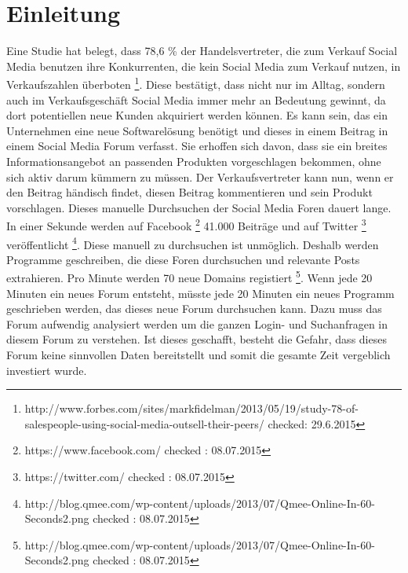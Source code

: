 
\section{Einleitung}
Eine Studie hat belegt, dass 78,6 \% der Handelsvertreter, die zum Verkauf Social Media benutzen ihre Konkurrenten, die kein Social Media zum Verkauf nutzen, in Verkaufszahlen überboten \footnote{http://www.forbes.com/sites/markfidelman/2013/05/19/study-78-of-salespeople-using-social-media-outsell-their-peers/ checked: 29.6.2015}.
Diese bestätigt, dass nicht nur im Alltag, sondern auch im Verkaufsgeschäft Social Media immer mehr an Bedeutung gewinnt, da dort potentiellen neue Kunden akquiriert werden können. Es kann sein, das ein Unternehmen eine neue Softwarelösung benötigt und dieses in einem Beitrag in einem Social Media Forum verfasst. Sie erhoffen sich davon, dass sie ein breites Informationsangebot an passenden Produkten vorgeschlagen bekommen, ohne sich aktiv darum kümmern zu müssen. Der Verkaufsvertreter kann nun, wenn er den Beitrag händisch findet, diesen Beitrag kommentieren und sein Produkt vorschlagen. 
Dieses manuelle Durchsuchen der Social Media Foren dauert lange. In einer Sekunde werden auf Facebook \footnote{https://www.facebook.com/ checked : 08.07.2015} 41.000 Beiträge und auf Twitter \footnote{https://twitter.com/ checked : 08.07.2015} veröffentlicht  \footnote{http://blog.qmee.com/wp-content/uploads/2013/07/Qmee-Online-In-60-Seconds2.png checked : 08.07.2015}. Diese manuell zu durchsuchen ist unmöglich. Deshalb werden Programme geschreiben, die diese Foren durchsuchen und relevante Posts extrahieren.  Pro Minute werden 70 neue Domains registiert \footnote{http://blog.qmee.com/wp-content/uploads/2013/07/Qmee-Online-In-60-Seconds2.png checked : 08.07.2015}. Wenn jede 20 Minuten ein neues Forum entsteht, müsste jede 20 Minuten ein neues Programm geschrieben werden, das dieses neue Forum durchsuchen kann. Dazu muss das Forum aufwendig analysiert werden um die ganzen Login- und Suchanfragen in diesem Forum zu verstehen. Ist dieses geschafft, besteht die Gefahr, dass dieses Forum keine sinnvollen Daten bereitstellt und somit die gesamte Zeit vergeblich investiert wurde.\\
